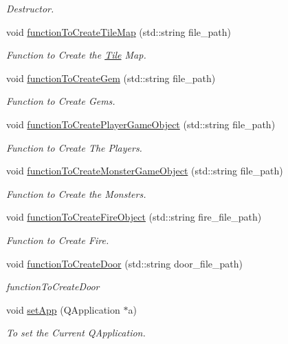 \begin{DoxyCompactItemize}
\begin{DoxyCompactList}\small\item\em Destructor. \end{DoxyCompactList}\item 
void \hyperlink{classReadInput_a3bf04a443a4ef1df2c1a380c81ba0f0b}{function\-To\-Create\-Tile\-Map} (std\-::string file\-\_\-path)
\begin{DoxyCompactList}\small\item\em Function to Create the \hyperlink{classTile}{Tile} Map. \end{DoxyCompactList}\item 
void \hyperlink{classReadInput_a8784d64abe0ee437915679d7d602ab10}{function\-To\-Create\-Gem} (std\-::string file\-\_\-path)
\begin{DoxyCompactList}\small\item\em Function to Create Gems. \end{DoxyCompactList}\item 
void \hyperlink{classReadInput_a1ed7e1e601b0fe876b289884c289bda5}{function\-To\-Create\-Player\-Game\-Object} (std\-::string file\-\_\-path)
\begin{DoxyCompactList}\small\item\em Function to Create The Players. \end{DoxyCompactList}\item 
void \hyperlink{classReadInput_a627c05559722971112fdc9b076234907}{function\-To\-Create\-Monster\-Game\-Object} (std\-::string file\-\_\-path)
\begin{DoxyCompactList}\small\item\em Function to Create the Monsters. \end{DoxyCompactList}\item 
void \hyperlink{classReadInput_acf8a8a99a12546eb1fd2871626411ec6}{function\-To\-Create\-Fire\-Object} (std\-::string fire\-\_\-file\-\_\-path)
\begin{DoxyCompactList}\small\item\em Function to Create Fire. \end{DoxyCompactList}\item 
void \hyperlink{classReadInput_a51ac6aba5ed863639d7cbbbd962a9996}{function\-To\-Create\-Door} (std\-::string door\-\_\-file\-\_\-path)
\begin{DoxyCompactList}\small\item\em function\-To\-Create\-Door \end{DoxyCompactList}\item 
void \hyperlink{classReadInput_a2aac5874b99ac1dc471ad8ea8ddbba8b}{set\-App} (Q\-Application $\ast$a)
\begin{DoxyCompactList}\small\item\em To set the Current Q\-Application. \end{DoxyCompactList}\end{DoxyCompactItemize}
